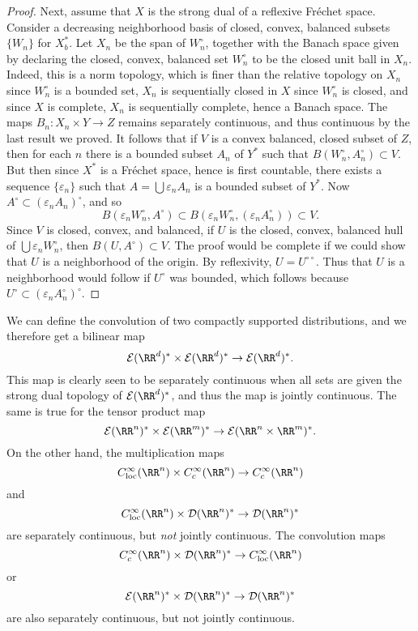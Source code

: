 \begin{proof}
    Next, assume that $X$ is the strong dual of a reflexive Fr\'{e}chet space. Consider a decreasing neighborhood basis of closed, convex, balanced subsets $\{ W_n \}$ for $X^*_b$. Let $X_n$ be the span of $W_n^\circ$, together with the Banach space given by declaring the closed, convex, balanced set $W_n^\circ$ to be the closed unit ball in $X_n$. Indeed, this is a norm topology, which is finer than the relative topology on $X_n$ since $W_n^\circ$ is a bounded set, $X_n$ is sequentially closed in $X$ since $W_n^\circ$ is closed, and since $X$ is complete, $X_n$ is sequentially complete, hence a Banach space. The maps $B_n: X_n \times Y \to Z$ remains separately continuous, and thus continuous by the last result we proved. It follows that if $V$ is a convex balanced, closed subset of $Z$, then for each $n$ there is a bounded subset $A_n$ of $Y^*$ such that $B(W_n^\circ, A_n^\circ) \subset V$. But then since $X^*$ is a Fr\'{e}chet space, hence is first countable, there exists a sequence $\{ \varepsilon_n \}$ such that $A = \bigcup \varepsilon_n A_n$ is a bounded subset of $Y^*$. Now $A^\circ \subset (\varepsilon_n A_n)^\circ$, and so
    \[ B(\varepsilon_n W_n^\circ, A^\circ) \subset B(\varepsilon_n W_n^\circ, (\varepsilon_n A_n^\circ)) \subset V. \]
    Since $V$ is closed, convex, and balanced, if $U$ is the closed, convex, balanced hull of $\bigcup \varepsilon_n W_n^\circ$, then $B(U,A^\circ) \subset V$. The proof would be complete if we could show that $U$ is a neighborhood of the origin. By reflexivity, $U = U^{\circ \circ}$. Thus that $U$ is a neighborhood would follow if $U^\circ$ was bounded, which follows because $U^\circ \subset (\varepsilon_n A_n^\circ)^\circ$.
\end{proof}

\begin{example}
    We can define the convolution of two compactly supported distributions, and we therefore get a bilinear map
    \[ \mathcal{E}(\RR^d)^* \times \mathcal{E}(\RR^d)^* \to \mathcal{E}(\RR^d)^*. \]
    This map is clearly seen to be separately continuous when all sets are given the strong dual topology of $\mathcal{E}(\RR^d)^*$, and thus the map is jointly continuous. The same is true for the tensor product map
    \[ \mathcal{E}(\RR^n)^* \times \mathcal{E}(\RR^m)^* \to \mathcal{E}(\RR^n \times \RR^m)^*. \]
    On the other hand, the multiplication maps
    \[ C^\infty_{\text{loc}}(\RR^n) \times C_c^\infty(\RR^n) \to C_c^\infty(\RR^n) \]
    and 
    \[ C^\infty_{\text{loc}}(\RR^n) \times \mathcal{D}(\RR^n)^* \to \mathcal{D}(\RR^n)^* \]
    are separately continuous, but \emph{not} jointly continuous. The convolution maps
    \[ C_c^\infty(\RR^n) \times \mathcal{D}(\RR^n)^* \to C^\infty_{\text{loc}}(\RR^n) \]
    or
    \[ \mathcal{E}(\RR^n)^* \times \mathcal{D}(\RR^n)^* \to \mathcal{D}(\RR^n)^* \]
    are also separately continuous, but not jointly continuous.
\end{example}

